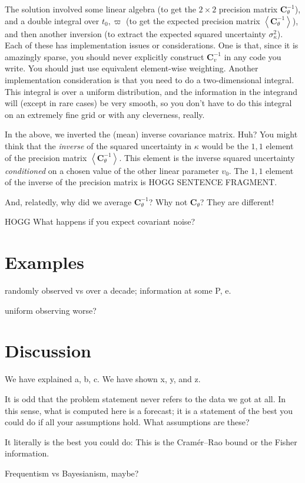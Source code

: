 \documentclass[10pt, letterpaper]{article}
\newcommand{\inv}{^{-1}}
\newcommand{\mean}[1]{\left<{#1}\right>}
\newcommand{\tensor}[1]{\mathbf{#1}}
\newcommand{\tC}{\tensor{C}}
\begin{document}
The solution involved some linear algebra (to get the $2\times 2$
precision matrix $\tC_\theta\inv$), and a double integral over $t_0,
\varpi$ (to get the expected precision matrix
$\mean{\tC_\theta\inv}$), and then another inversion (to extract the
expected squared uncertainty $\sigma^2_\kappa$). Each of these has
implementation issues or considerations. One is that, since it
is amazingly sparse, you should never explicitly construct $\tC_v\inv$
in any code you write. You should just use equivalent element-wise
weighting.
Another implementation consideration is that you need to do a two-dimensional
integral. This integral is over a uniform distribution, and the information
in the integrand will (except in rare cases) be very smooth, so you don't
have to do this integral on an extremely fine grid or with any cleverness,
really.

In the above, we inverted the (mean) inverse covariance matrix. Huh?
You might think that the \emph{inverse} of the squared uncertainty in $\kappa$ would be
the $1,1$ element of the precision matrix $\mean{\tC_\theta\inv}$.
This element is the inverse squared uncertainty \emph{conditioned} on
a chosen value of the other linear parameter $v_0$.
The $1,1$ element of the inverse of the precision matrix is HOGG SENTENCE FRAGMENT.

And, relatedly, why did we average $\tC_\theta\inv$? Why not $\tC_\theta$?
They are different!

HOGG What happens if you expect covariant noise?

\section{Examples}
randomly observed vs over a decade; information at some P, e.

uniform observing worse?

\section{Discussion}\label{sec:discussion}

We have explained a, b, c. We have shown x, y, and z.

It is odd that the problem statement never refers to the data we got at all.
In this sense, what is computed here is a forecast; it is a statement of the
best you could do if all your assumptions hold. What assumptions are these?

It literally is the best you could do:
This is the Cram\'er--Rao bound or the Fisher information.

Frequentism vs Bayesianism, maybe?

\clearmargin\clearpage\raggedright

\end{document}

